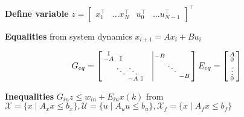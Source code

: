 \textbf{Define variable} $z =
	\begin{bmatrix}
		x_1^\top & \dots x_N^\top & u_0^\top & \dots u_{N-1}^\top
	\end{bmatrix}^\top$

\textbf{Equalities} from system dynamics
$x_{i+1} = Ax_i + Bu_i$

\[
	G_{eq} =
	\begin{bmatrix}
		\begin{smallmatrix}
			\mathbb{I}& & & \\
			-A & \mathbb{I} && \\
			&  \ddots & \ddots \\
			&&-A & \mathbb{I}
		\end{smallmatrix}
		 & \vline
		\begin{smallmatrix}
			-B \\
			& \ddots \\
			& &-B
		\end{smallmatrix}
	\end{bmatrix}
	E_{eq} =
	\begin{bsmallmatrix}
		A      \\
		0      \\
		\vdots \\
		0
	\end{bsmallmatrix}
\]

\textbf{Inequalities}
$G_{in}z \leq w_{in} + E_{in}x(k)$ from
$\mathcal{X}   = \{x \mid A_x x \leq b_x\},
	\mathcal{U}   = \{u \mid A_u u \leq b_u\},
	\mathcal{X}_f = \{x \mid A_f x \leq b_f\}$

